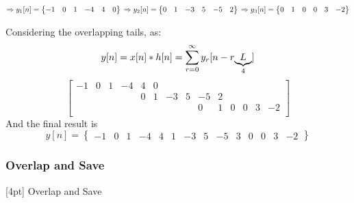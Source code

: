 {        $
        \Rightarrow y_1[n]=\begin{Bmatrix}
            -1 & 0 & 1 & -4 & 4 & 0
        \end{Bmatrix}\\
        \Rightarrow y_2[n]=\begin{Bmatrix}
            0 & 1 & -3 & 5 & -5 & 2
        \end{Bmatrix}\\
        \Rightarrow y_3[n]=\begin{Bmatrix}
            0 & 1 & 0 & 0 & 3 & -2
        \end{Bmatrix}
        $

        \vspace{1em}
        Considering the overlapping tails, as:
        $$
        y[n]=x[n]*h[n]=\sum_{r=0}^\infty y_r[n-r\underlabel{L}{4}]
        $$
        $$
        \begin{bmatrix}
            -1 & 0 & 1 &-4 & 4 & 0\\
            &   &   &   & 0 & 1 &-3 & 5 &-5 & 2\\    
            &   &   &   &   &   &   &   & 0 & 1 & 0 & 0 & 3 & -2\\    
        \end{bmatrix}
        $$
        And the final result is
        $$
        y[n]=\begin{Bmatrix}
            -1 & 0 & 1 & -4 & 4 & 1 & -3 & 5 & -5 & 3 & 0 & 0 & 3 & -2
        \end{Bmatrix}
        $$
    }
    \subsubsection{Overlap and Save}
    [4pt] Overlap and Save

